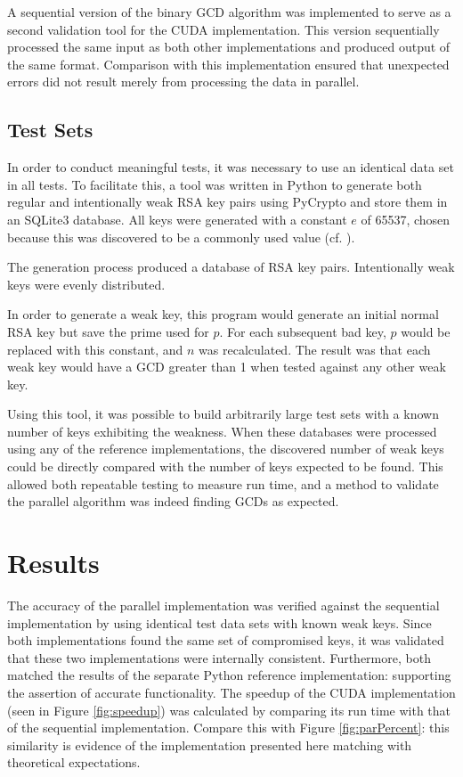 \documentclass[12pt]{ucthesis}
\begin{document}
A sequential version of the binary GCD algorithm was implemented to serve as a 
second validation tool for the CUDA implementation. This version sequentially 
processed the same input as both other implementations and produced output of the 
same format. Comparison with this implementation ensured that unexpected errors 
did not result merely from processing the data in parallel.

\subsection{Test Sets}
\label{sec:testsets}
In order to conduct meaningful tests, it was necessary to use an identical 
data set in all tests. To facilitate this, a tool was written in Python to 
generate both regular and intentionally weak RSA key pairs using PyCrypto and store them in an SQLite3 database. All keys were generated with a 
constant $e$ of 65537, chosen because this was discovered to be a commonly used 
value (cf. \cite{lenstra:ron}).

The generation process produced a database of RSA key pairs. 
Intentionally weak keys were evenly distributed. 

In order to generate a weak key, this program would generate an initial 
normal RSA key but save the prime used for $p$. For each subsequent bad key, 
$p$ would be replaced with this constant, and $n$ was recalculated. The 
result was that each weak key would have a GCD greater than 1 when 
tested against any other weak key. 

Using this tool, it was possible to build arbitrarily large test sets with a 
known number of keys exhibiting the weakness. When these databases 
were processed using any of the reference implementations, the 
discovered number of weak keys could be directly compared with the 
number of keys expected to be found. This allowed both repeatable testing to 
measure run time, and a method to validate the parallel algorithm was indeed 
finding GCDs as expected. 

\section{Results}
\label{sec:results}
The accuracy of the parallel implementation was verified against the 
sequential implementation by using identical test data sets with known 
weak keys. Since both implementations found the same set of compromised keys,
it was validated that these two implementations 
were internally consistent. Furthermore, both matched the results of the 
separate Python reference implementation: supporting the assertion of accurate 
functionality. The speedup of the CUDA implementation (seen in Figure 
\ref{fig:speedup}) was calculated by comparing its run time with that of the
sequential implementation. Compare this with Figure \ref{fig:parPercent}:
this similarity is evidence of the implementation presented here matching
with theoretical expectations.
\end{document}
